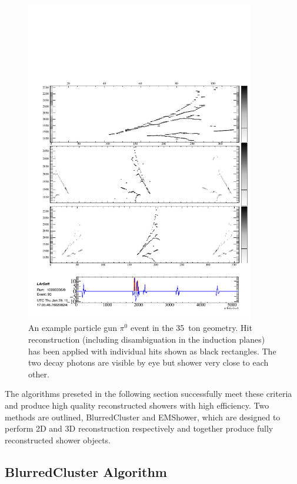 \begin{figure}
  \centering
  \includegraphics[width=10cm]{EVDPi0Hits.pdf}
  \caption[An example particle gun $\pi^0$ event in the 35~ton geometry.]{An example particle gun $\pi^0$ event in the 35~ton geometry.  Hit reconstruction (including disambiguation in the induction planes) has been applied with individual hits shown as black rectangles.  The two decay photons are visible by eye but shower very close to each other.}
  \label{fig:pi0Showers}
\end{figure}

The algorithms preseted in the following section successfully meet these criteria and produce high quality reconstructed showers with high efficiency.  Two methods are outlined, BlurredCluster and EMShower, which are designed to perform 2D and 3D reconstruction respectively and together produce fully reconstructed shower objects.

\subsection{BlurredCluster Algorithm}\label{sec:BlurredCluster}

